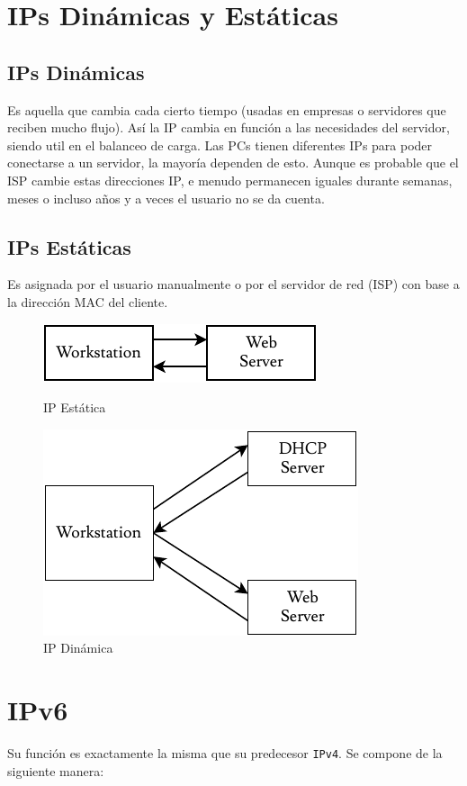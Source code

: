 \section*{IPs Dinámicas y Estáticas}
\subsection*{IPs Dinámicas} 
Es aquella que cambia cada cierto tiempo (usadas en empresas o servidores que reciben mucho flujo). Así la IP cambia en función a las necesidades del servidor, siendo util en el balanceo de carga. Las PCs tienen diferentes IPs para poder conectarse a un servidor, la mayoría dependen de esto. Aunque es probable que el ISP cambie estas direcciones IP, e menudo permanecen iguales durante semanas, meses o incluso años y a veces el usuario no se da cuenta.
\subsection*{IPs Estáticas}
Es asignada por el usuario manualmente o por el servidor de red (ISP) con base a la dirección MAC del cliente.

\begin{figure}[H]
  \centering
  \begin{minipage}[b]{0.4\textwidth}
    \includegraphics[page=1,scale=0.7]{ESTATICO.pdf}
    \caption{IP Estática}
  \end{minipage}
  \begin{minipage}[b]{0.4\textwidth}
    \includegraphics[page=1,scale=0.7]{DINAMICO.pdf}
    \caption{IP Dinámica}
  \end{minipage}
\end{figure}

\section*{IPv6}
Su función es exactamente la misma que su predecesor \texttt{IPv4}. Se compone de la siguiente manera:


